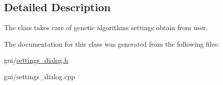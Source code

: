 \subsection{Detailed Description}
The class takes care of genetic algorithm\textquotesingle{}s settings obtain from user. 

The documentation for this class was generated from the following files\+:\begin{DoxyCompactItemize}
\item 
gui/\hyperlink{settings__dialog_8h}{settings\+\_\+dialog.\+h}\item 
gui/settings\+\_\+dialog.\+cpp\end{DoxyCompactItemize}
